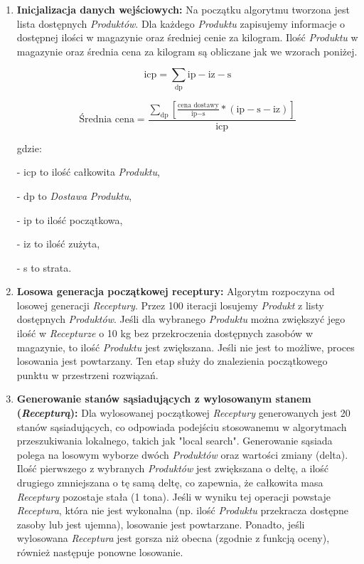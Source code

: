 \documentclass[shortabstract]{iithesis}
\begin{document}
\begin{enumerate} 

\item \textbf{Inicjalizacja danych wejściowych:} Na początku algorytmu tworzona jest lista dostępnych \textit{Produktów}. Dla każdego \textit{Produktu} zapisujemy informacje o dostępnej ilości w magazynie oraz średniej cenie za kilogram. Ilość \textit{Produktu} w magazynie oraz średnia cena za kilogram są obliczane jak we wzorach poniżej.

$$\textrm{icp} = \sum\limits_{\textrm{dp}} \textrm{ip} - \textrm{iz} - \textrm{s} $$

$$ \textrm{Średnia cena} = \frac{\sum\limits_{\textrm{dp}} [\frac{\textrm{cena dostawy}}  {\textrm{ip}-\textrm{s}} * (\textrm{ip}-\textrm{s}-\textrm{iz})]}{\textrm{icp}} $$

gdzie:

- icp to ilość całkowita \textit{Produktu},

- dp to \textit{Dostawa} \textit{Produktu},

- ip to ilość początkowa,

- iz to ilość zużyta,

- s to strata.





\item \textbf{Losowa generacja początkowej receptury:} Algorytm rozpoczyna od losowej generacji \textit{Receptury}. Przez 100 iteracji losujemy \textit{Produkt} z listy dostępnych \textit{Produktów}. Jeśli dla wybranego \textit{Produktu} można zwiększyć jego ilość w \textit{Recepturze} o 10 kg bez przekroczenia dostępnych zasobów w magazynie, to ilość \textit{Produktu} jest zwiększana. Jeśli nie jest to możliwe, proces losowania jest powtarzany. Ten etap służy do znalezienia początkowego punktu w przestrzeni rozwiązań.

\item \textbf{Generowanie stanów sąsiadujących z wylosowanym stanem (\textit{Recepturą}):} Dla wylosowanej początkowej \textit{Receptury} generowanych jest 20 stanów sąsiadujących, co odpowiada podejściu stosowanemu w algorytmach przeszukiwania lokalnego, takich jak "local search". Generowanie sąsiada polega na losowym wyborze dwóch \textit{Produktów} oraz wartości zmiany (delta). Ilość pierwszego z wybranych \textit{Produktów} jest zwiększana o deltę, a ilość drugiego zmniejszana o tę samą deltę, co zapewnia, że całkowita masa \textit{Receptury} pozostaje stała (1 tona). Jeśli w wyniku tej operacji powstaje \textit{Receptura}, która nie jest wykonalna (np. ilość \textit{Produktu} przekracza dostępne zasoby lub jest ujemna), losowanie jest powtarzane. Ponadto, jeśli wylosowana \textit{Receptura} jest gorsza niż obecna (zgodnie z funkcją oceny), również następuje ponowne losowanie.


\end{enumerate}
\end{document}
